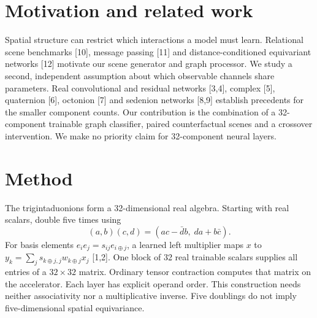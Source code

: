 \documentclass[10pt]{article}
\title{\studytitle}
\author{Libor \textquotedblleft Burny\textquotedblright\ Burian}
\date{27 November 2026}
\begin{document}
\maketitle
\begin{abstract}
A noisy sensor observes one component of an unknown linear mixing of an object's excitation. A graph neural network must identify two objects through intermediary landmarks and predict whether they have the same hidden type. We cross the multiplication rule used by the sensor with the rule used to tie neural weights. This synthetic intervention measures whether compatible weight sharing improves end-to-end decisions. Across 8 independent simulated worlds, a network matched to the canonical sensor classified 90.04\% (95\% interval 89.28\% to 90.79\%) of held-out scenes correctly. A network matched to the randomized sensor classified 90.06\% (95\% interval 89.63\% to 90.49\%) correctly. The mean benefit of matching the sensor rule was 39.59 percentage points on canonical sensors and 39.58 points on randomized sensors. Both directional matching criteria passed. On the corrected natural-image test set, the paired difference for canonical minus randomized sharing was -0.28 points (95\% interval -0.80 to +0.24). The upper bound rules out a one-point canonical advantage for this training recipe.
\end{abstract}
\section{Motivation and related work}
Spatial structure can restrict which interactions a model must learn. Relational scene benchmarks [10], message passing [11] and distance-conditioned equivariant networks [12] motivate our scene generator and graph processor. We study a second, independent assumption about which observable channels share parameters. Real convolutional and residual networks [3,4], complex [5], quaternion [6], octonion [7] and sedenion networks [8,9] establish precedents for the smaller component counts. Our contribution is the combination of a 32-component trainable graph classifier, paired counterfactual scenes and a crossover intervention. We make no priority claim for 32-component neural layers.
\section{Method}
The trigintaduonions form a 32-dimensional real algebra. Starting with real scalars, double five times using
\[
 (a,b)(c,d)=(ac-\bar d b,\;da+b\bar c).
\]
For basis elements $e_i e_j=s_{ij}e_{i\oplus j}$, a learned left multiplier maps $x$ to $y_k=\sum_j s_{k\oplus j,j}w_{k\oplus j}x_j$ [1,2]. One block of 32 real trainable scalars supplies all entries of a $32\times32$ matrix. Ordinary tensor contraction computes that matrix on the accelerator. Each layer has explicit operand order. This construction needs neither associativity nor a multiplicative inverse. Five doublings do not imply five-dimensional spatial equivariance.
 
\end{document}
